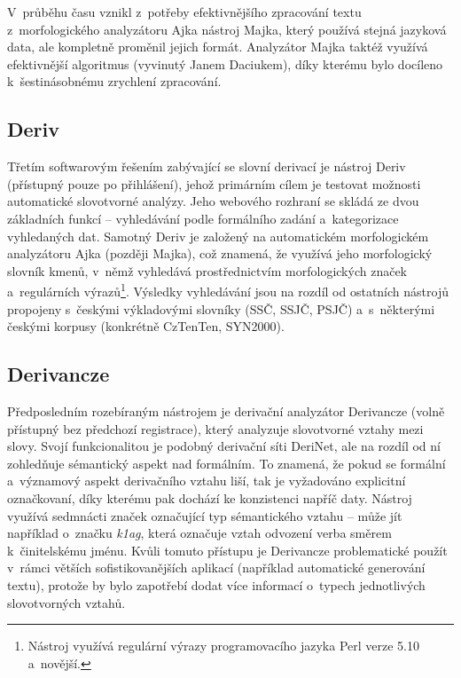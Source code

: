 V~průběhu času vznikl z~potřeby efektivnějšího zpracování textu
z~morfologického analyzátoru Ajka nástroj Majka, který používá stejná
jazyková data, ale kompletně proměnil jejich formát. Analyzátor Majka
taktéž využívá efektivnější algoritmus (vyvinutý Janem Daciukem), díky
kterému bylo docíleno k~šestinásobnému zrychlení zpracování.
\parencite{majka}

\hypertarget{deriv}{%
\subsection{Deriv}\label{deriv}}

Třetím softwarovým řešením zabývající se slovní derivací je nástroj
Deriv (přístupný pouze po přihlášení), jehož primárním cílem je testovat
možnosti automatické slovotvorné analýzy. Jeho webového rozhraní se
skládá ze dvou základních funkcí -- vyhledávání podle formálního zadání
a~kategorizace vyhledaných dat. Samotný Deriv je založený na
automatickém morfologickém analyzátoru Ajka (později Majka), což
znamená, že využívá jeho morfologický slovník kmenů, v~němž vyhledává
prostřednictvím morfologických značek a~regulárních
výrazů\footnote{Nástroj využívá regulární výrazy programovacího jazyka Perl verze 5.10 a~novější.}.
Výsledky vyhledávání jsou na rozdíl od ostatních nástrojů propojeny
s~českými výkladovými slovníky (SSČ, SSJČ, PSJČ) a~s~některými českými
korpusy (konkrétně CzTenTen, SYN2000).~\parencite{deriv}

\hypertarget{derivancze}{%
\subsection{Derivancze}\label{derivancze}}

Předposledním rozebíraným nástrojem je derivační analyzátor Derivancze
(volně přístupný bez předchozí registrace), který analyzuje slovotvorné
vztahy mezi slovy. Svojí funkcionalitou je podobný derivační síti
DeriNet, ale na rozdíl od ní zohledňuje sémantický aspekt nad formálním.
To znamená, že pokud se formální a~významový aspekt derivačního vztahu
liší, tak je vyžadováno explicitní označkovaní, díky kterému pak dochází
ke konzistenci napříč daty. Nástroj využívá sedmnácti značek označující
typ sémantického vztahu -- může jít například o~značku \emph{k1ag},
která označuje vztah odvození verba směrem k~činitelskému jménu. Kvůli
tomuto přístupu je Derivancze problematické použít v~rámci větších
sofistikovanějších aplikací (například automatické generování textu),
protože by bylo zapotřebí dodat více informací o~typech jednotlivých
slovotvorných vztahů.~\parencite{derivancze}

